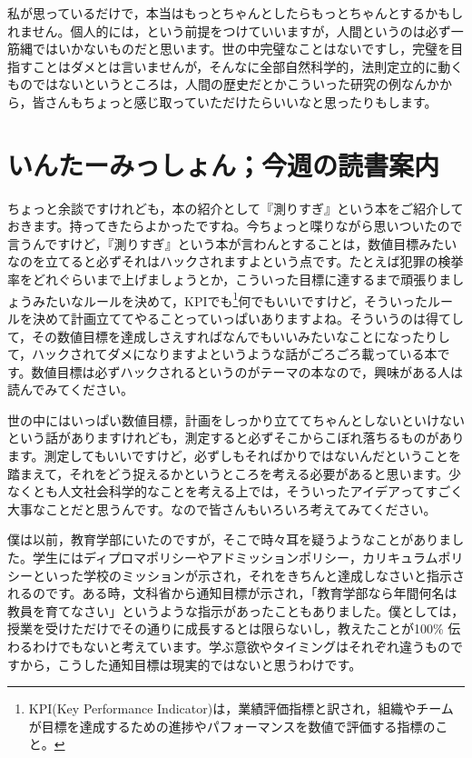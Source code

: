 \documentclass{ltjsbook}
\begin{document}
私が思っているだけで，本当はもっとちゃんとしたらもっとちゃんとするかもしれません。個人的には，という前提をつけていいますが，人間というのは必ず一筋縄ではいかないものだと思います。世の中完璧なことはないですし，完璧を目指すことはダメとは言いませんが，そんなに全部自然科学的，法則定立的に動くものではないというところは，人間の歴史だとかこういった研究の例なんかから，皆さんもちょっと感じ取っていただけたらいいなと思ったりもします。

\section{いんたーみっしょん；今週の読書案内}

ちょっと余談ですけれども，本の紹介として『測りすぎ』という本\parencite{Jerry2019}をご紹介しておきます。持ってきたらよかったですね。今ちょっと喋りながら思いついたので言うんですけど，『測りすぎ』という本が言わんとすることは，数値目標みたいなのを立てると必ずそれはハックされますよという点です。たとえば犯罪の検挙率をどれぐらいまで上げましょうとか，こういった目標に達するまで頑張りましょうみたいなルールを決めて，KPIでも\footnote{KPI(Key Performance Indicator)は，業績評価指標と訳され，組織やチームが目標を達成するための進捗やパフォーマンスを数値で評価する指標のこと。}何でもいいですけど，そういったルールを決めて計画立ててやることっていっぱいありますよね。そういうのは得てして，その数値目標を達成しさえすればなんでもいいみたいなことになったりして，ハックされてダメになりますよというような話がごろごろ載っている本です。数値目標は必ずハックされるというのがテーマの本なので，興味がある人は読んでみてください。

世の中にはいっぱい数値目標，計画をしっかり立ててちゃんとしないといけないという話がありますけれども，測定すると必ずそこからこぼれ落ちるものがあります。測定してもいいですけど，必ずしもそればかりではないんだということを踏まえて，それをどう捉えるかというところを考える必要があると思います。少なくとも人文社会科学的なことを考える上では，そういったアイデアってすごく大事なことだと思うんです。なので皆さんもいろいろ考えてみてください。

僕は以前，教育学部にいたのですが，そこで時々耳を疑うようなことがありました。学生にはディプロマポリシーやアドミッションポリシー，カリキュラムポリシーといった学校のミッションが示され，それをきちんと達成しなさいと指示されるのです。ある時，文科省から通知目標が示され，「教育学部なら年間何名は教員を育てなさい」というような指示があったこともありました。僕としては，授業を受けただけでその通りに成長するとは限らないし，教えたことが100\% 伝わるわけでもないと考えています。学ぶ意欲やタイミングはそれぞれ違うものですから，こうした通知目標は現実的ではないと思うわけです。
\end{document}
